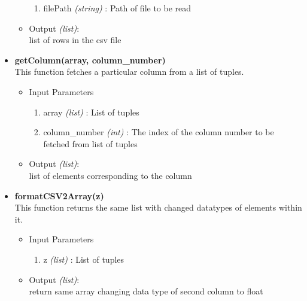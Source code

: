 \begin{itemize}
\begin{itemize}
	  \begin{enumerate}
	    \item filePath \textit{(string)} : Path of file to be read
	    \end{enumerate}

	  \item Output \textit{(list)}: \\
	  list of rows in the csv file
	  
	\end{itemize}
 
 \item \textbf{getColumn(array, column\_number)} \\
 
   This function fetches a particular column from a list of tuples.
 
 \begin{itemize}
	  \item Input Parameters
	  
	  \begin{enumerate}
	    \item array \textit{(list)} : List of tuples
	    \item column\_number \textit{(int)} : The index of the column number to be fetched from list of tuples
	    \end{enumerate}

	  \item Output \textit{(list)}: \\
	  list of elements corresponding to the column
	  
	\end{itemize}
	
 \item \textbf{formatCSV2Array(z)} \\
 
    This function returns the same list with changed datatypes of elements within it.
 
 \begin{itemize}
	  \item Input Parameters
	  
	  \begin{enumerate}
	    \item z \textit{(list)} : List of tuples
	    \end{enumerate}

	  \item Output \textit{(list)}: \\
	  return same array changing data type of second column to float
	  
	\end{itemize}
 

\end{itemize}


